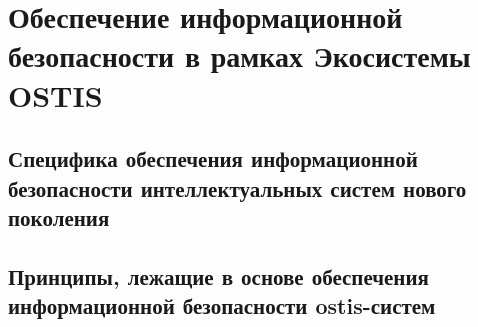\chapter{Обеспечение информационной безопасности в рамках Экосистемы OSTIS}
\label{chapter_security}


\section{Специфика обеспечения информационной безопасности интеллектуальных систем нового поколения}
\section{Принципы, лежащие в основе обеспечения информационной безопасности ostis-систем}


%